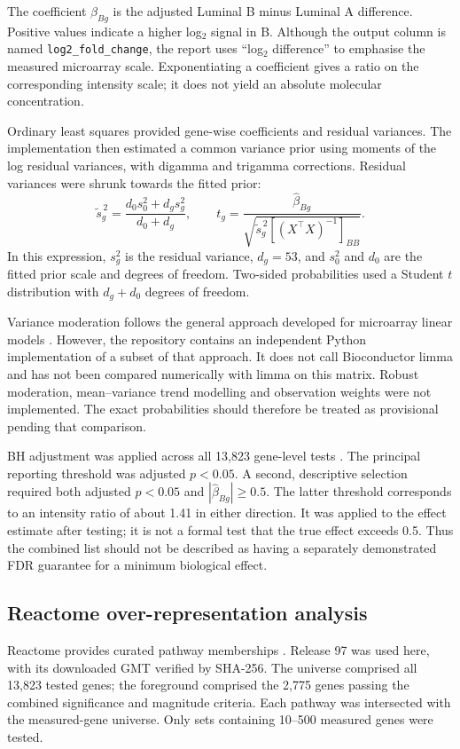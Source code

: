 \documentclass[11pt,a4paper]{article}
\begin{document}
The coefficient $\beta_{Bg}$ is the adjusted Luminal B minus Luminal A difference. Positive values indicate a higher log$_2$ signal in B. Although the output column is named \texttt{log2\_fold\_change}, the report uses ``log$_2$ difference'' to emphasise the measured microarray scale. Exponentiating a coefficient gives a ratio on the corresponding intensity scale; it does not yield an absolute molecular concentration.

Ordinary least squares provided gene-wise coefficients and residual variances. The implementation then estimated a common variance prior using moments of the log residual variances, with digamma and trigamma corrections. Residual variances were shrunk towards the fitted prior:
\begin{equation}
\widetilde{s}^{\,2}_g=\frac{d_0s_0^2+d_gs_g^2}{d_0+d_g},\qquad
t_g=\frac{\widehat{\beta}_{Bg}}{\sqrt{\widetilde{s}^{\,2}_g[(X^\top X)^{-1}]_{BB}}}.
\label{eq:moderation}
\end{equation}
In this expression, $s_g^2$ is the residual variance, $d_g=53$, and $s_0^2$ and $d_0$ are the fitted prior scale and degrees of freedom. Two-sided probabilities used a Student $t$ distribution with $d_g+d_0$ degrees of freedom.

Variance moderation follows the general approach developed for microarray linear models \cite{Smyth2004,Ritchie2015}. However, the repository contains an independent Python implementation of a subset of that approach. It does not call Bioconductor limma and has not been compared numerically with limma on this matrix. Robust moderation, mean--variance trend modelling and observation weights were not implemented. The exact probabilities should therefore be treated as provisional pending that comparison.

BH adjustment was applied across all 13,823 gene-level tests \cite{BH1995}. The principal reporting threshold was adjusted $p<0.05$. A second, descriptive selection required both adjusted $p<0.05$ and $|\widehat{\beta}_{Bg}|\geq0.5$. The latter threshold corresponds to an intensity ratio of about 1.41 in either direction. It was applied to the effect estimate after testing; it is not a formal test that the true effect exceeds 0.5. Thus the combined list should not be described as having a separately demonstrated FDR guarantee for a minimum biological effect.



\subsection{Reactome over-representation analysis}
Reactome provides curated pathway memberships \cite{Reactome2024}. Release 97 was used here, with its downloaded GMT verified by SHA-256. The universe comprised all 13,823 tested genes; the foreground comprised the 2,775 genes passing the combined significance and magnitude criteria. Each pathway was intersected with the measured-gene universe. Only sets containing 10--500 measured genes were tested.
\end{document}
